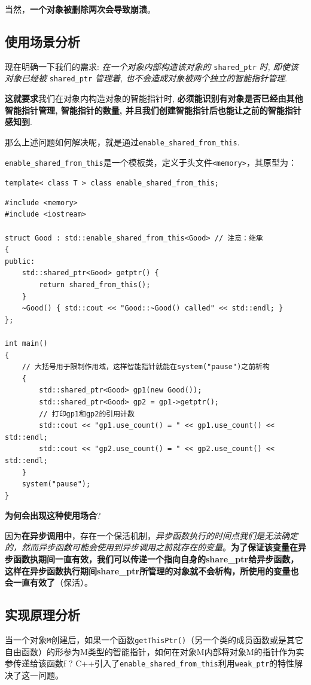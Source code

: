 \documentclass[UTF8,a4paper,12pt]{ctexbook}
\begin{document}
	当然，\textbf{一个对象被删除两次会导致崩溃}。
	
	\subsection{使用场景分析}
		现在明确一下我们的需求: \textit{在一个对象内部构造该对象的} \verb|shared_ptr| \textit{时, 即使该对象已经被} \verb|shared_ptr| \textit{管理着, 也不会造成对象被两个独立的智能指针管理}.
	
		\textbf{这就要求}我们在对象内构造对象的智能指针时, \textbf{必须能识别有对象是否已经由其他智能指针管理, 智能指针的数量, 并且我们创建智能指针后也能让之前的智能指针感知到}.
		
		那么上述问题如何解决呢，就是通过\verb|enable_shared_from_this|.
		
		\verb|enable_shared_from_this|是一个模板类，定义于头文件\verb|<memory>|，其原型为：
		
		\verb|template< class T > class enable_shared_from_this;|
		
		\begin{lstlisting}
#include <memory>
#include <iostream>
 
struct Good : std::enable_shared_from_this<Good> // 注意：继承
{
public:
	std::shared_ptr<Good> getptr() {
		return shared_from_this();
	}
	~Good() { std::cout << "Good::~Good() called" << std::endl; }
};
 
int main()
{
	// 大括号用于限制作用域，这样智能指针就能在system("pause")之前析构
	{
		std::shared_ptr<Good> gp1(new Good());
		std::shared_ptr<Good> gp2 = gp1->getptr();
		// 打印gp1和gp2的引用计数
		std::cout << "gp1.use_count() = " << gp1.use_count() << std::endl;
		std::cout << "gp2.use_count() = " << gp2.use_count() << std::endl;
	}
	system("pause");
} 		
		\end{lstlisting}
		
		\textbf{为何会出现这种使用场合}?
		
		因为\textbf{在异步调用中}，存在一个保活机制，\textit{异步函数执行的时间点我们是无法确定的，然而异步函数可能会使用到异步调用之前就存在的变量}。\textbf{为了保证该变量在异步函数执期间一直有效，我们可以传递一个指向自身的share\_ptr给异步函数，这样在异步函数执行期间share\_ptr所管理的对象就不会析构，所使用的变量也会一直有效了}（保活）。
	
	\subsection{实现原理分析}
		当一个对象\verb|M|创建后，如果一个函数\verb|getThisPtr()|（另一个类的成员函数或是其它自由函数）的形参为M类型的智能指针，如何在对象M内部将对象M的指针作为实参传递给该函数f ? C++引入了\verb|enable_shared_from_this|利用\verb|weak_ptr|的特性解决了这一问题。
	
\end{document}
